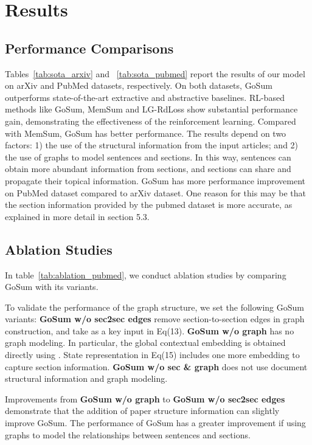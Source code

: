 \documentclass[11pt,a4paper]{article}
\begin{document}
 
\section{Results}

\subsection{Performance Comparisons}
Tables~\ref{tab:sota_arxiv} and ~\ref{tab:sota_pubmed} report the results of our model on arXiv and PubMed datasets, respectively.
On both datasets, GoSum outperforms state-of-the-art extractive and abstractive baselines. 
RL-based methods like GoSum, MemSum and LG-RdLoss show substantial performance gain, demonstrating the effectiveness of the reinforcement learning.
Compared with MemSum, GoSum has better performance. The results depend on two factors: 1) the use of the structural information from the input articles; and 2) the use of graphs to model sentences and sections. In this way, sentences can obtain more abundant information from sections, and sections can share and propagate their topical information.
GoSum has more performance improvement on PubMed dataset compared to arXiv dataset. One reason for this may be that the section information provided by the pubmed dataset is more accurate, as explained in more detail in section 5.3.



\subsection{Ablation Studies}

In table~\ref{tab:ablation_pubmed}, we conduct ablation studies by comparing GoSum with its variants.


To validate the performance of the graph structure, we set the following GoSum variants:
\textbf{GoSum w/o sec2sec edges} remove section-to-section edges in graph construction, and take  as a key input in Eq(13).
\textbf{GoSum w/o graph} has no graph modeling. In particular, the global contextual embedding  is obtained directly using . State representation  in Eq(15) includes one more embedding  to capture section information.
\textbf{GoSum w/o sec \& graph} does not use document structural information and graph modeling.

Improvements from \textbf{GoSum w/o graph} to \textbf{GoSum w/o sec2sec edges} demonstrate that the addition of paper structure information can slightly improve GoSum. The performance of GoSum has a greater improvement if using graphs to model the relationships between sentences and sections.
\end{document}

